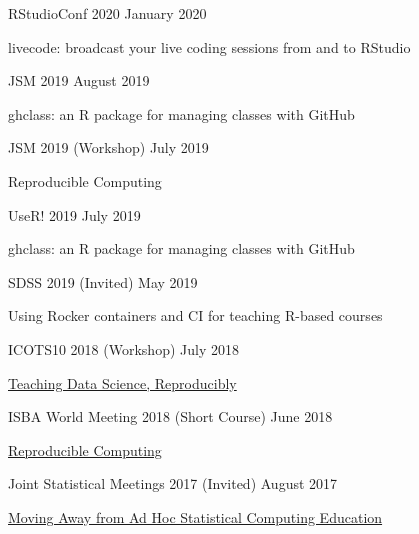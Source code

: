 \documentclass[margin,line]{res}
\begin{document}
\begin{resume}
RStudioConf 2020 \hfill January 2020
\begin{list1}
\item[] livecode: broadcast your live coding sessions from and to RStudio
\end{list1}
\vspace{-3mm}

JSM 2019 \hfill August 2019
\begin{list1}
\item[] ghclass: an R package for managing classes with GitHub
\end{list1}
\vspace{-3mm}

JSM 2019 (Workshop) \hfill July 2019
\begin{list1}
\item[] Reproducible Computing
\end{list1}
\vspace{-3mm}


UseR! 2019 \hfill July 2019
\begin{list1}
\item[] ghclass: an R package for managing classes with GitHub
\end{list1}
\vspace{-3mm}

SDSS 2019 (Invited) \hfill May 2019
\begin{list1}
\item[] Using Rocker containers and CI for teaching R-based courses
\end{list1}
\vspace{-3mm}

ICOTS10 2018 (Workshop) \hfill July 2018
\begin{list1}
\item[] \href{https://mine-cetinkaya-rundel.github.io/teach-data-sci-icots2018/}{Teaching Data Science, Reproducibly}
\end{list1}
\vspace{-3mm}

ISBA World Meeting 2018 (Short Course) \hfill June 2018
\begin{list1}
\item[] \href{https://mine-cetinkaya-rundel.github.io/repro-compute-isba18/}{Reproducible Computing}
\end{list1}
\vspace{-3mm}

Joint Statistical Meetings 2017 (Invited) \hfill August 2017
\begin{list1}
\item[] \href{https://github.com/rundel/Presentations/tree/master/JSM%202017}{Moving Away from Ad Hoc Statistical Computing Education}
\end{list1}
\vspace{-3mm}


\end{resume}
\end{document}
